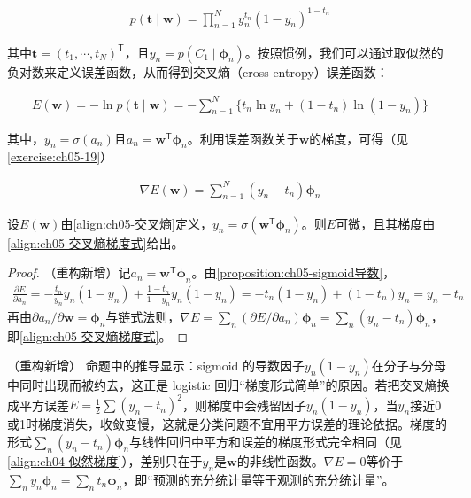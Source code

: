 \documentclass[../../main.tex]{subfiles}
\begin{document}
\begin{align}
  p(\boldsymbol{t}\mid\boldsymbol{w})=\prod_{n=1}^{N}y_n^{t_n}(1-y_n)^{1-t_n}
  \label{align:ch05-logistic似然}
\end{align}

其中$\boldsymbol{t}=(t_1,\cdots,t_N)^{\mathsf{T}}$，且$y_n=p(C_1\mid\boldsymbol{\phi}_n)$。按照惯例，我们可以通过取似然的负对数来定义误差函数，从而得到交叉熵（cross-entropy）误差函数：

\begin{align}
  E(\boldsymbol{w})=-\ln p(\boldsymbol{t}\mid\boldsymbol{w})=-\sum_{n=1}^{N}\bigl\{t_n\ln y_n+(1-t_n)\ln(1-y_n)\bigr\}
  \label{align:ch05-交叉熵}
\end{align}

其中，$y_n=\sigma(a_n)$且$a_n=\boldsymbol{w}^{\mathsf{T}}\boldsymbol{\phi}_n$。利用误差函数关于$\boldsymbol{w}$的梯度，可得（见\cref{exercise:ch05-19}）

\begin{align}
  \nabla E(\boldsymbol{w})=\sum_{n=1}^{N}(y_n-t_n)\boldsymbol{\phi}_n
  \label{align:ch05-交叉熵梯度式}
\end{align}

\begin{proposition}[交叉熵误差的梯度]\label{proposition:ch05-交叉熵梯度}
设$E(\boldsymbol{w})$由\eqref{align:ch05-交叉熵}定义，$y_n=\sigma(\boldsymbol{w}^{\mathsf{T}}\boldsymbol{\phi}_n)$。则$E$可微，且其梯度由\eqref{align:ch05-交叉熵梯度式}给出。
\end{proposition}

\begin{proof}
（重构新增）记$a_n=\boldsymbol{w}^{\mathsf{T}}\boldsymbol{\phi}_n$。由\cref{proposition:ch05-sigmoid导数}，
\begin{align}
  \frac{\partial E}{\partial a_n}=-\frac{t_n}{y_n}y_n(1-y_n)+\frac{1-t_n}{1-y_n}y_n(1-y_n)=-t_n(1-y_n)+(1-t_n)y_n=y_n-t_n
\end{align}
再由$\partial a_n/\partial\boldsymbol{w}=\boldsymbol{\phi}_n$与链式法则，$\nabla E=\sum_n(\partial E/\partial a_n)\boldsymbol{\phi}_n=\sum_n(y_n-t_n)\boldsymbol{\phi}_n$，即\eqref{align:ch05-交叉熵梯度式}。
\end{proof}

\begin{remark}（重构新增）
命题中的推导显示：sigmoid 的导数因子$y_n(1-y_n)$在分子与分母中同时出现而被约去，这正是 logistic 回归“梯度形式简单”的原因。若把交叉熵换成平方误差$E=\frac12\sum(y_n-t_n)^2$，则梯度中会残留因子$y_n(1-y_n)$，当$y_n$接近0或1时梯度消失，收敛变慢，这就是分类问题不宜用平方误差的理论依据。梯度的形式$\sum_n(y_n-t_n)\boldsymbol{\phi}_n$与线性回归中平方和误差的梯度形式完全相同（见\cref{align:ch04-似然梯度}），差别只在于$y_n$是$\boldsymbol{w}$的非线性函数。$\nabla E=0$等价于$\sum_n y_n\boldsymbol{\phi}_n=\sum_n t_n\boldsymbol{\phi}_n$，即“预测的充分统计量等于观测的充分统计量”。
\end{remark}
\end{document}
